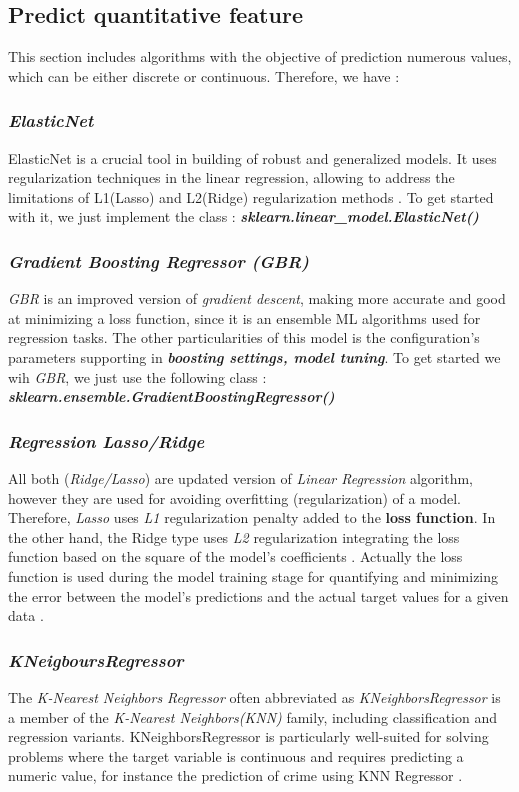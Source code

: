 \documentclass[12pt,a4paper, oneside]{book}
\begin{document}
\subsection{Predict quantitative feature} 
This section includes algorithms with the objective of prediction numerous values, which can be either discrete or continuous. Therefore, we have :
\subsubsection{\textit{ElasticNet}}
ElasticNet is a crucial tool in building of robust and generalized models. It uses regularization techniques in the linear regression, allowing to address the limitations of L1(Lasso) and L2(Ridge) regularization methods \cite{johnsen2020elastic}. 
To get started with it, we just implement the class : \textit{\textbf{sklearn.linear\_model.ElasticNet()}}

\subsubsection{\textit{Gradient Boosting Regressor (GBR)}}
\textit{GBR} is an improved version of \textit{gradient descent}, making more accurate and good at minimizing a loss function, since it is an ensemble ML algorithms used for regression tasks. 
The other particularities of this model is the configuration's parameters supporting in \textbf{\textit{boosting settings, model tuning}}. 
To get started we wih \textit{GBR}, we just use the following class : \textit{\textbf{sklearn.ensemble.GradientBoostingRegressor()}}

\subsubsection{\textit{Regression Lasso/Ridge}}
 All both (\textit{Ridge/Lasso}) are updated version of \textit{Linear Regression} algorithm, however they are used for avoiding overfitting (regularization) of a model. Therefore, \textit{Lasso} uses \textit{L1} regularization penalty added to the \textbf{loss function}. 
 In the other hand, the Ridge type uses \textit{L2} regularization integrating the loss function based on the square of the model's coefficients \cite{hazan2011optimal}. 
 Actually the loss function is used during the model training stage for quantifying and minimizing the error between the model's predictions and the actual target values for a given data \cite{wang2020comprehensive}.  
 
 \subsubsection{\textit{KNeigboursRegressor}}
 The \textit{K-Nearest Neighbors Regressor} often abbreviated as \textit{KNeighborsRegressor} is a member of the \textit{K-Nearest Neighbors(KNN)} family, including classification and regression variants. KNeighborsRegressor is particularly well-suited for solving problems where the target variable is continuous and requires predicting a numeric value, for instance the prediction of crime using KNN Regressor \cite{alsayadi2022improving}.
 
\end{document}
